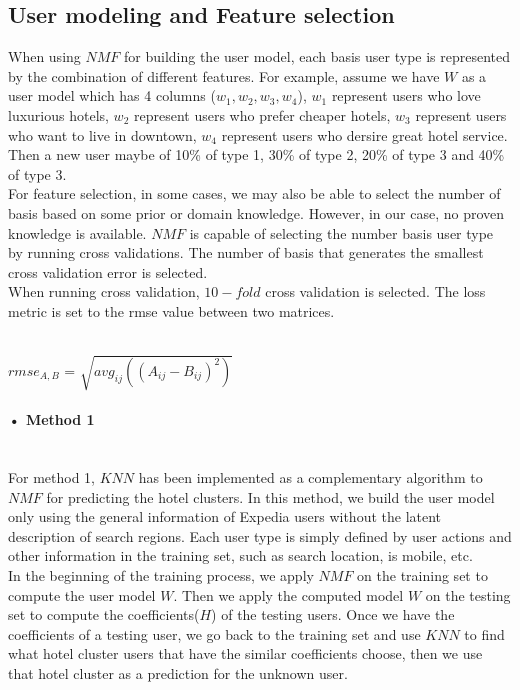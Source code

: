 \documentclass[11pt]{article} %
\begin{document}
\subsection{User modeling and Feature selection}
When using $NMF$ for building the user model, each basis user type is represented by the combination of different features. For example, assume we have $W$ as a user model which has 4 columns ($w_{1}, w_{2}, w_{3}, w_{4}$), $w_{1}$ represent users who love luxurious hotels, $w_{2}$ represent users who prefer cheaper hotels, $w_{3}$ represent users who want to live in downtown, $w_{4}$ represent users who dersire great hotel service. Then a new user maybe of 10\% of type 1, 30\% of type 2, 20\% of type 3 and 40\% of type 3.\\    
For feature selection, in some cases, we may also be able to select the number of basis based on some prior or domain knowledge. However, in our case, no proven knowledge is available. $NMF$ is capable of selecting the number basis user type by running cross validations. The number of basis that generates the smallest cross validation error is selected.\\
When running cross validation, $10-fold$ cross validation is selected. The loss metric is set to the rmse value between two matrices.\\\\
\centerline{$rmse_{A,B}$ = $\sqrt{avg_{ij}((A_{ij}-B_{ij})^{2})}$}

\paragraph{• Method 1}\mbox{}\\
For method 1, $KNN$ has been implemented as a complementary algorithm to $NMF$ for predicting the hotel clusters. In this method, we build the user model only using the general information of Expedia users without the latent description of search regions. Each user type is simply defined by user actions and other information in the training set, such as search location, is mobile, etc.\\
In the beginning of the training process, we apply $NMF$ on the training set to compute the user model $W$. Then we apply the computed model $W$ on the testing set to compute the coefficients($H$) of the testing users. Once we have the coefficients of a testing user, we go back to the training set and use $KNN$ to find what hotel cluster users that have the similar coefficients choose, then we use that hotel cluster as a prediction for the unknown user.
\end{document}
